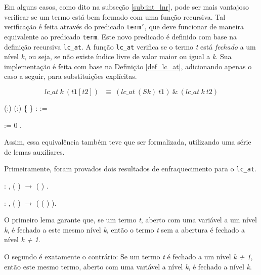 Em alguns casos, como dito na subseção \ref{sub:int_lnr}, pode ser mais
vantajoso verificar se um termo está bem formado com uma função recursiva.
Tal verificação é feita através do predicado \texttt{term'}, que deve funcionar de
maneira equivalente ao predicado \texttt{term}. Este novo predicado é definido
com base na definição recursiva \texttt{lc\_at}. A função \texttt{lc\_at}
verifica se o termo \emph{t} está \textit{fechado} a um nível \emph{k}, ou seja,
se não existe índice livre de valor maior ou igual a \emph{k}. Sua implementação
é feita com base na Definição \ref{def_lc_at}, adicionando apenas o caso a
seguir, para substituições explícitas.

\[  lc\_at\ k\ (t1[t2])\ \ \ \equiv\ (lc\_at\ (S k)\ t1)\ \&\ (lc\_at\ k\ t2) \]

\bigskip
{}  (:)
(:) \{ \} :
 :=\coqdoceol

   :=  0 .\coqdoceol
\bigskip

Assim, essa equivalência também teve que ser formalizada, utilizando uma série
de lemas auxiliares. 

Primeiramente, foram provados dois resultados de enfraquecimento para o
\texttt{lc\_at}.

\bigskip
\coqnoindent {}  :
\coqdockw{\ensuremath{\forall}}  
,  
(   )
\ensuremath{\rightarrow}  ( )
.\coqdoceol

\coqnoindent {}  :
\coqdockw{\ensuremath{\forall}}  
,  (
)  \ensuremath{\rightarrow} 
 (  (
) ).\coqdoceol
\bigskip

O primeiro lema garante que, se um termo \emph{t}, aberto com uma variável a um
nível \emph{k}, é fechado a este mesmo nível \emph{k}, então o termo \emph{t}
sem a abertura é fechado a nível \emph{k + 1}.

O segundo é exatamente o contrário: Se um termo \emph{t} é fechado a um nível
\emph{k + 1}, então este mesmo termo, aberto com uma variável a nível \emph{k},
é fechado a nível \emph{k}.

